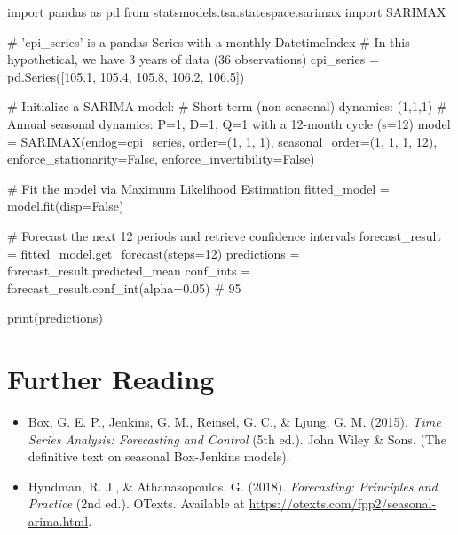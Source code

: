 \begin{Python}[caption={SARIMA Implementation using Statsmodels}, label={lst:sarima_python}]
import pandas as pd
from statsmodels.tsa.statespace.sarimax import SARIMAX

# 'cpi_series' is a pandas Series with a monthly DatetimeIndex
# In this hypothetical, we have 3 years of data (36 observations)
cpi_series = pd.Series([105.1, 105.4, 105.8, 106.2, 106.5])

# Initialize a SARIMA model:
# Short-term (non-seasonal) dynamics: (1,1,1)
# Annual seasonal dynamics: P=1, D=1, Q=1 with a 12-month cycle (s=12)
model = SARIMAX(endog=cpi_series, 
                order=(1, 1, 1), 
                seasonal_order=(1, 1, 1, 12),
                enforce_stationarity=False,
                enforce_invertibility=False)

# Fit the model via Maximum Likelihood Estimation
fitted_model = model.fit(disp=False)

# Forecast the next 12 periods and retrieve confidence intervals
forecast_result = fitted_model.get_forecast(steps=12)
predictions = forecast_result.predicted_mean
conf_ints = forecast_result.conf_int(alpha=0.05) # 95%

print(predictions)
\end{Python}

\section{Further Reading}
\begin{itemize}
    \item Box, G. E. P., Jenkins, G. M., Reinsel, G. C., \& Ljung, G. M. (2015). \textit{Time Series Analysis: Forecasting and Control} (5th ed.). John Wiley \& Sons. (The definitive text on seasonal Box-Jenkins models).
    \item Hyndman, R. J., \& Athanasopoulos, G. (2018). \textit{Forecasting: Principles and Practice} (2nd ed.). OTexts. Available at \url{https://otexts.com/fpp2/seasonal-arima.html}. \cite{Hyndman2018}
\end{itemize}
